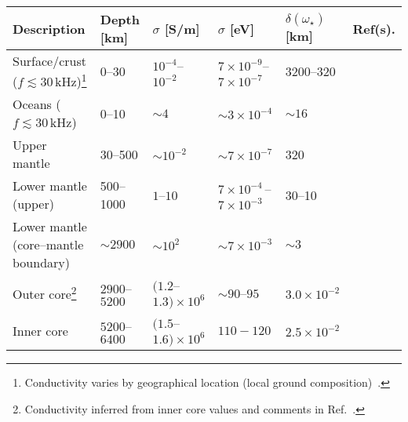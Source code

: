 \documentclass[amsmath,amssymb,aps,10pt,prd,letterpaper,nofootinbib,balancelastpage,notitlepage,superscriptaddress,twocolumn,floatfix]{revtex4-2}
\newcommand{\appref}[2][x]{Appendi{#1}~\ref{#2}}	%
\newcommand{\citeR}[2][]{Ref{#1}.~\cite{#2}}		%
\begin{document}
\begin{table*}[t]
\begin{ruledtabular}
\caption{\label{tab:earthConductivity}%
	  Representative values for the conductivity of various parts of the bulk of the Earth.
	  We give a description, approximate depth below Earth's surface, reference conductivity $\sigma$ (or range of conductivities) in both SI and natural units,%
        \footnote{\label{ftnt:conductivityUnits}%
            Recall: $1\,\text{S/m} \equiv 1/(\Omega\text{m}) \approx 7.4\times 10^{-5}\,\text{eV}\approx 10^{11}\,\text{s}^{-1}$. 
            In older literature, units of `e.m.u.' are sometimes used: $1\,\text{S/m}=10^{-11}\,$e.m.u.
            } %
      active-mode skin-depth $\delta \sim (\sigma \omega / 2)^{-1/2}$ (see \appref{app:systemBehavior}) for $\omega \sim \omega_\star \equiv 10^{-18}\,$eV given the reference conductivity (or range), and references for the conductivity values quoted.
      The specific numbers quoted here are less important than the following general conclusion: the active-mode skin-depths for the lower mantle and deeper layers are all some orders of magnitude smaller than the thicknesses of those layers, making the Earth an excellent conductor that damps the interacting component efficiently at a radius that is $\mathcal{O}(1)$ of the full radius of the Earth.
	 }
\begin{tabular}{llllll}
Description & Depth [km] & $\sigma$ [S/m] &  $\sigma$ [eV] & $\delta(\omega_\star)$ [km] & Ref(s). \\ \hline
Surface/crust ($f\lesssim 30\,$kHz)\footnote{Conductivity varies by geographical location (local ground composition)~\cite{atlas}.} & 0--30 & $10^{-4}$--$10^{-2}$ & $7\times 10^{-9}$--$7\times 10^{-7}$ & 3200--320 & \cite{atlas}\\
Oceans ($f\lesssim 30\,$kHz)          & 0--10 & $\sim 4$ & $\sim 3\times 10^{-4}$ & $\sim 16$ & \cite{atlas} \\
Upper mantle    & 30--500    &   $\sim 10^{-2}$ & $\sim 7\times 10^{-7}$ & 320 & \cite{1970QJRAS..11...23P,Hutton_1976} \\
Lower mantle (upper)    & 500--1000 &  $1$--$10$ & $7\times 10^{-4}\,$--$7\times 10^{-3}$ & 30--10 & \cite{1970QJRAS..11...23P,Hutton_1976} \\
Lower mantle (core--mantle boundary) & $\sim 2900$ & $\sim 10^2$ & $\sim 7\times 10^{-3}$ & $\sim 3$ & \cite{Peyronneau1989} \\
Outer core\footnote{Conductivity inferred from inner core values and comments in \citeR{Pozzo_2012}.} & $2900$--$5200$ & $(1.2$--$1.3)\times 10^6$    & $\sim 90$--$95$   & $3.0\times10^{-2}$ & \cite{Pozzo_2012}\\
Inner core & $5200$--$6400$ & $(1.5$--$1.6)\times 10^6$    & $110-120$   & $2.5\times10^{-2}$ & \cite{Pozzo_2012}
\end{tabular}
\end{ruledtabular}
\end{table*}
\end{document}
